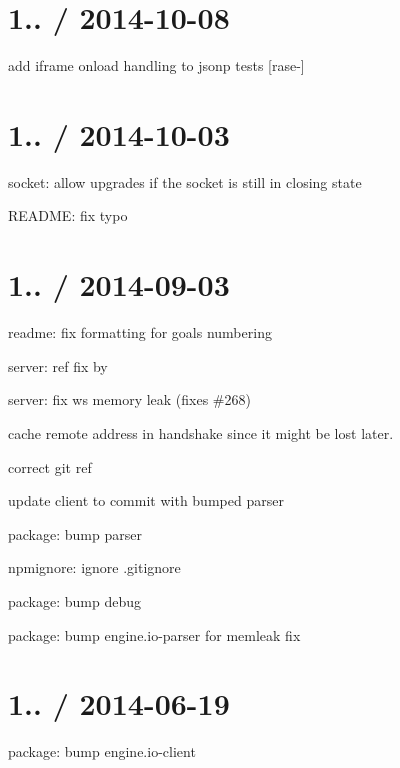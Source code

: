 \section*{1.. / 2014-\/10-\/08 }


\begin{DoxyItemize}
\item add iframe onload handling to jsonp tests \mbox{[}rase-\/\mbox{]}
\end{DoxyItemize}

\section*{1.. / 2014-\/10-\/03 }


\begin{DoxyItemize}
\item socket\+: allow upgrades if the socket is still in closing state
\item R\+E\+A\+D\+ME\+: fix typo
\end{DoxyItemize}

\section*{1.. / 2014-\/09-\/03 }


\begin{DoxyItemize}
\item readme\+: fix formatting for goals numbering
\item server\+: ref fix by 
\item server\+: fix ws memory leak (fixes \#268)
\item cache remote address in handshake since it might be lost later.
\item correct git ref
\item update client to commit with bumped parser
\item package\+: bump parser
\item npmignore\+: ignore {\ttfamily .gitignore}
\item package\+: bump {\ttfamily debug}
\item package\+: bump {\ttfamily engine.\+io-\/parser} for memleak fix
\end{DoxyItemize}

\section*{1.. / 2014-\/06-\/19 }


\begin{DoxyItemize}
\item package\+: bump {\ttfamily engine.\+io-\/client}
\end{DoxyItemize}

